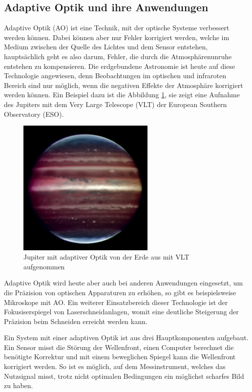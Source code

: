 \begin{refsection}
\section{Adaptive Optik und ihre Anwendungen}
Adaptive Optik (AO) ist eine Technik, mit der optische Systeme verbessert werden können. Dabei können aber nur Fehler korrigiert werden, welche im Medium zwischen der Quelle des Lichtes und dem Sensor entstehen, hauptsächlich geht es also darum, Fehler, die durch die Atmosphärenunruhe entstehen zu kompensieren. Die erdgebundene Astronomie ist heute auf diese Technologie angewiesen, denn Beobachtungen im optischen und infraroten Bereich sind nur möglich, wenn die negativen Effekte der Atmosphäre korrigiert werden können. Ein Beispiel dazu ist die Abbildung \ref{fig:jupiter}, sie zeigt eine Aufnahme des Jupiters mit dem Very Large Telescope (VLT) der European Southern Observatory (ESO).
\begin{figure}
  \centering
  \includegraphics[width=0.6\textwidth]{adaptiv/images/Jupiter_adaptiv}
  \caption{Jupiter mit adaptiver Optik von der Erde aus mit VLT aufgenommen
    \cite{eso:jupiter}}
  \label{fig:jupiter}
\end{figure}
Adaptive Optik wird heute aber auch bei anderen Anwendungen eingesetzt, um die Präzision von optischen Apparaturen zu erhöhen, so gibt es beispielsweise Mikroskope mit AO. Ein weiterer Einsatzbereich dieser Technologie ist der Fokusiserspiegel von Laserschneidanlagen, womit eine deutliche Steigerung der Präzision beim Schneiden erreicht werden kann.

Ein System mit einer adaptiven Optik ist aus drei Hauptkomponenten aufgebaut. Ein Sensor misst die Störung der Wellenfront, einen Computer berechnet die benötigte Korrektur und mit einem beweglichen Spiegel kann die Wellenfront korrigiert werden. So ist es möglich, auf dem Messinstrument, welches das Nutzsignal misst, trotz nicht optimalen Bedingungen ein möglichst scharfes Bild zu haben.


\end{refsection}

